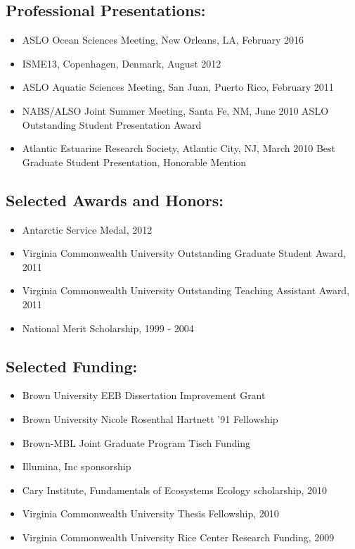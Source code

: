 \subsection*{Professional Presentations:}\label{recent-presentations}

\begin{itemize}
\tightlist
\item
  ASLO Ocean Sciences Meeting, New Orleans, LA, February 2016
\item
  ISME13, Copenhagen, Denmark, August 2012
\item
  ASLO Aquatic Sciences Meeting, San Juan, Puerto Rico, February 2011
\item
  NABS/ALSO Joint Summer Meeting, Santa Fe, NM, June 2010 ASLO
  Outstanding Student Presentation Award
\item
  Atlantic Estuarine Research Society, Atlantic City, NJ, March 2010
  Best Graduate Student Presentation, Honorable Mention
\end{itemize}

\subsection*{Selected Awards and Honors:}\label{awards-and-honors}

\begin{itemize}
\tightlist
\item
   Antarctic Service Medal, 2012
\item
  Virginia Commonwealth University Outstanding Graduate Student Award, 2011
\item  
  Virginia Commonwealth University Outstanding Teaching Assistant Award, 2011
\item
  National Merit Scholarship, 1999 - 2004
\end{itemize}

\subsection*{Selected Funding:}\label{funding}

\begin{itemize}
\tightlist
\item
Brown University EEB Dissertation Improvement Grant
\item
  Brown University Nicole Rosenthal Hartnett '91 Fellowship
\item
Brown-MBL Joint Graduate Program Tisch Funding
\item
 Illumina, Inc sponsorship
\item
  Cary Institute, Fundamentals of Ecosystems Ecology scholarship, 2010
\item
  Virginia Commonwealth University Thesis Fellowship, 2010
\item
  Virginia Commonwealth University Rice Center Research Funding, 2009
\end{itemize}

